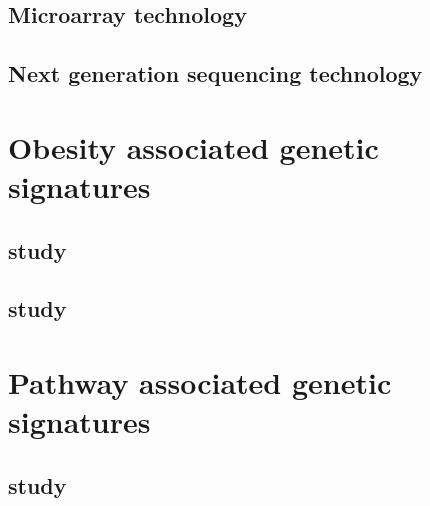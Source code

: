 \subsection{Microarray technology}
\label{subsec:microarray_technology}

\subsection{Next generation sequencing technology}
\label{sub:next_generation sequencing_technology}





\section{Obesity associated genetic signatures}
\label{sec:obesity_associated_genetic_signatures}

\subsection{\citet{Creighton2012} study}
\label{sub:creighton_study}



\subsection{\citet{Fuentes-Mattei2014} study}
\label{sub:fuentes_mattei_study}




\section{Pathway associated genetic signatures}
\label{sec:pathway_associated_genetic_signatures}


\subsection{\citep{Gatza2011} study}
\label{sub:gatza_study}





